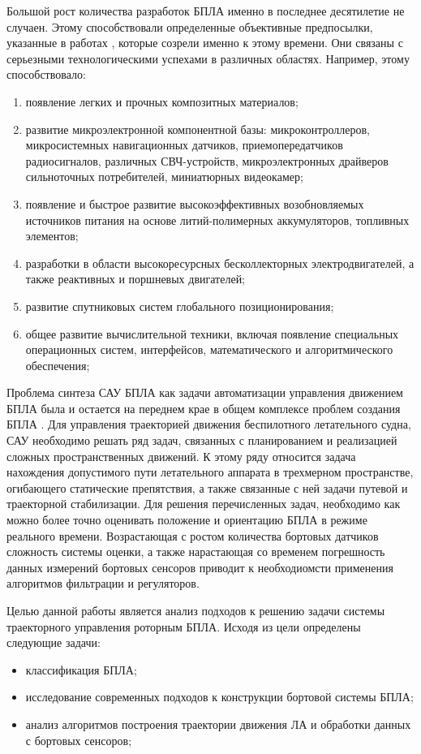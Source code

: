 \documentclass[pract, och, master]{SCWorks}
\begin{document}
Большой рост количества разработок БПЛА именно в последнее десятилетие не случаен. Этому 
способствовали определенные объективные предпосылки, указанные в работах \cite{uvDev,kbpa}, которые созрели именно к этому времени. 
Они связаны с серьезными технологическими успехами в различных областях. Например, этому 
способствовало:
\begin{enumerate}
	\item появление легких и прочных композитных материалов;
	\item развитие микроэлектронной компонентной базы: микроконтроллеров, микросистемных навигационных 
	датчиков, приемопередатчиков радиосигналов, различных СВЧ-устройств, микроэлектронных драйверов 
	сильноточных потребителей, миниатюрных видеокамер;
	\item появление и быстрое развитие высокоэффективных возобновляемых источников питания на основе 
	литий-полимерных аккумуляторов, топливных элементов;
	\item разработки в области высокоресурсных бесколлекторных электродвигателей, а также 
	реактивных и поршневых двигателей;
	\item развитие спутниковых систем глобального позиционирования;
	\item общее развитие вычислительной техники, включая появление специальных операционных систем, 
	интерфейсов, математического и алгоритмического обеспечения;
\end{enumerate}

Проблема синтеза САУ БПЛА как задачи автоматизации управления движением БПЛА была и остается на переднем крае в 
общем комплексе проблем создания БПЛА \cite{kbpa}. Для управления траекторией движения беспилотного летательного судна, 
САУ необходимо решать ряд задач, связанных с планированием и реализацией сложных пространственных движений. К этому ряду относится 
задача нахождения допустимого пути летательного аппарата в трехмерном пространстве, огибающего статические препятствия, 
а также связанные с ней задачи путевой и траекторной стабилизации. 
Для решения перечисленных задач, необходимо как можно более точно оценивать положение и ориентацию БПЛА в режиме реального времени. 
Возрастающая с ростом количества бортовых датчиков сложность системы оценки, а также нарастающая со временем погрешность данных измерений 
бортовых сенсоров приводит к необходиомсти применения алгоритмов фильтрации и регуляторов.   


Целью данной работы является 
анализ подходов к решению задачи системы траекторного управления роторным БПЛА. 
Исходя из цели определены следующие задачи:
\begin{itemize}
	\item классификация БПЛА;
	\item исследование современных подходов к конструкции бортовой системы БПЛА;
	\item анализ алгоритмов построения траектории движения ЛА и обработки данных с бортовых сенсоров;
\end{itemize}
 
\end{document}
